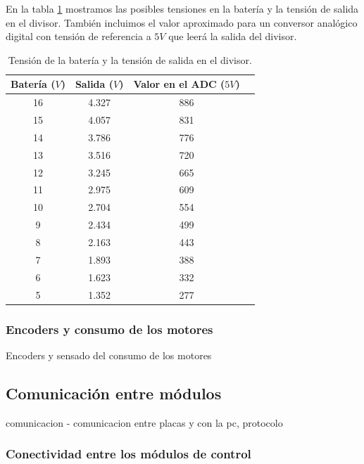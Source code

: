 En la tabla \ref{HTdivT} mostramos las posibles tensiones en la bater\'ia y la tensi\'on de salida en el divisor. Tambi\'en incluimos el
valor aproximado para un conversor anal\'ogico digital con tensi\'on de referencia a $5V$ que leer\'a la salida del divisor.

\begin{table}
	\begin{center}
		\begin{tabular}{|c|c|c|c|}
			\hline
			Bater\'ia ($V$) & Salida ($V$) & Valor en el ADC ($5V$) \\
			\hline
			16 & 4.327 & 886 \\
			15 & 4.057 & 831 \\
			14 & 3.786 & 776 \\
			13 & 3.516 & 720 \\
			12 & 3.245 & 665 \\
			11 & 2.975 & 609 \\
			10 & 2.704 & 554 \\
			 9 & 2.434 & 499 \\
			 8 & 2.163 & 443 \\
			 7 & 1.893 & 388 \\
			 6 & 1.623 & 332 \\
			 5 & 1.352 & 277 \\
			\hline
		\end{tabular}
	\end{center}
	\caption{Tensi\'on de la bater\'ia y la tensi\'on de salida en el divisor.}
	\label{HTdivT}
\end{table}

\subsubsection{Encoders y consumo de los motores}
\label{HSencodersConsumo}

Encoders y sensado del consumo de los motores

\subsection{Comunicaci\'on entre m\'odulos}
\label{Hcomm}

comunicacion - comunicacion entre placas y con la pc, protocolo

\subsubsection{Conectividad entre los m\'odulos de control}
\label{HCconectividad}

